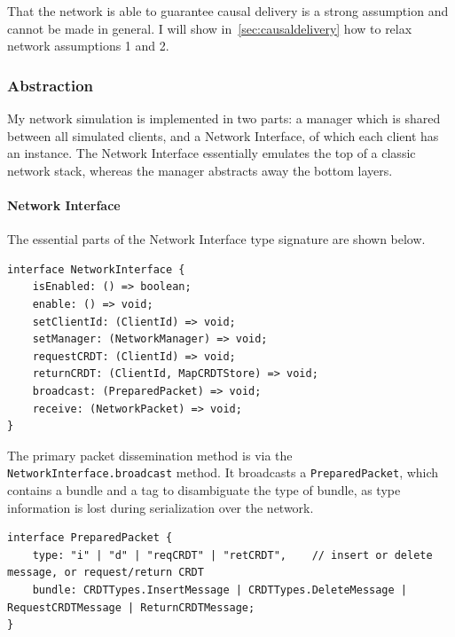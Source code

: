 \documentclass[12pt,a4paper,twoside,openright]{report}
\begin{document}
		That the network is able to guarantee causal delivery is a strong assumption and cannot be made in general. I will show in~\cref{sec:causaldelivery} how to relax network assumptions 1 and 2.
		
		\subsubsection{Abstraction}
		My network simulation is implemented in two parts: a manager which is shared between all simulated clients, and a Network Interface, of which each client has an instance. The Network Interface essentially emulates the top of a classic network stack, whereas the manager abstracts away the bottom layers. 

		\paragraph{Network Interface} The essential parts of the Network Interface type signature are shown below.
		
\begin{lstlisting}[caption=NetworkInterface Type Signature (cleaned)]
interface NetworkInterface {
	isEnabled: () => boolean;
	enable: () => void;
	setClientId: (ClientId) => void;
	setManager: (NetworkManager) => void;
	requestCRDT: (ClientId) => void;
	returnCRDT: (ClientId, MapCRDTStore) => void;
	broadcast: (PreparedPacket) => void;
	receive: (NetworkPacket) => void;
}
\end{lstlisting}

		The primary packet dissemination method is via the \lstinline|NetworkInterface.broadcast| method. It broadcasts a \lstinline|PreparedPacket|, which contains a bundle and a tag to disambiguate the type of bundle, as type information is lost during serialization over the network.

\begin{lstlisting}	
interface PreparedPacket {
	type: "i" | "d" | "reqCRDT" | "retCRDT",    // insert or delete message, or request/return CRDT
	bundle: CRDTTypes.InsertMessage | CRDTTypes.DeleteMessage | RequestCRDTMessage | ReturnCRDTMessage;
}
\end{lstlisting}
		
\end{document}
